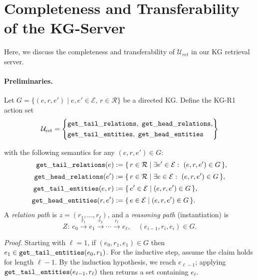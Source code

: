 \section{Completeness and Transferability of the KG-Server}
\label{appendix:theoretical_proof}
\label{app:kg-r1-proofs}

Here, we discuss the completeness and transferability of $\mathcal{U}_{ret}$ in our KG retrieval server.

\paragraph{Preliminaries.}
Let \(G=\{(e,r,e')\mid e,e'\!\in\!\mathcal{E},\,r\!\in\!\mathcal{R}\}\) be a directed KG.
Define the \textsc{KG-R1} action set
\[
\mathcal{U}_{\text{ret}} = 
\left\{
\begin{aligned}
&\mathtt{get\_tail\_relations},\ \mathtt{get\_head\_relations},\\
&\mathtt{get\_tail\_entities},\ \mathtt{get\_head\_entities}
\end{aligned}
\right\}
\]

with the following semantics for any \((e,r,e')\in G\):
\begin{align*}
\gettailrelations(e)
&:= \{\, r \in \mathcal{R} \mid \exists e'\in\mathcal{E}:\ (e,r,e')\in G \,\},\\[2pt]
\getheadrelations(e')
&:= \{\, r \in \mathcal{R} \mid \exists e\in\mathcal{E}:\ (e,r,e')\in G \,\},\\[2pt]
\gettailentities(e,r)
&:= \{\, e' \in \mathcal{E} \mid (e,r,e')\in G \,\},\\[2pt]
\getheadentities(r,e')
&:= \{\, e \in \mathcal{E} \mid (e,r,e')\in G \,\}.
\end{align*}
A \emph{relation path} is \(z=(r_1,\ldots,r_\ell)\), and a \emph{reasoning path} (instantiation) is
\[
Z:\ e_0 \xrightarrow{r_1} e_1 \xrightarrow{r_2} \cdots \xrightarrow{r_\ell} e_\ell,
\quad (e_{i-1},r_i,e_i)\in G.
\]




\completeness*


\noindent \emph{Proof.}
Starting with \(\ell=1\), if \((e_0,r_1,e_1)\in G\) then \(e_1\in\mathtt{get\_tail\_entities}(e_0,r_1)\).
For the inductive step, assume the claim holds for length \(\ell-1\).
By the induction hypothesis, we reach \(e_{\ell-1}\); applying \(\mathtt{get\_tail\_entities}(e_{\ell-1},r_\ell)\) then returns a set containing \(e_\ell\).

\vspace{1.0\baselineskip} 







